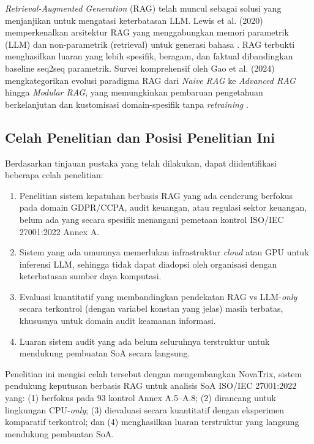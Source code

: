 \documentclass[bachelor,bahasa]{thesisdtetiugm}
\begin{document}
\textit{Retrieval-Augmented Generation} (RAG) telah muncul sebagai solusi yang menjanjikan untuk mengatasi keterbatasan LLM. Lewis et al. (2020) memperkenalkan arsitektur RAG yang menggabungkan memori parametrik (LLM) dan non-parametrik (retrieval) untuk generasi bahasa \cite{ragoriginal}. RAG terbukti menghasilkan luaran yang lebih spesifik, beragam, dan faktual dibandingkan baseline seq2seq parametrik. Survei komprehensif oleh Gao et al. (2024) mengkategorikan evolusi paradigma RAG dari \textit{Naive RAG} ke \textit{Advanced RAG} hingga \textit{Modular RAG}, yang memungkinkan pembaruan pengetahuan berkelanjutan dan kustomisasi domain-spesifik tanpa \textit{retraining} \cite{ragsurvey2024}.

\subsection{Celah Penelitian dan Posisi Penelitian Ini}

Berdasarkan tinjauan pustaka yang telah dilakukan, dapat diidentifikasi beberapa celah penelitian:

\begin{enumerate}
	\item Penelitian sistem kepatuhan berbasis RAG yang ada cenderung berfokus pada domain GDPR/CCPA, audit keuangan, atau regulasi sektor keuangan, belum ada yang secara spesifik menangani pemetaan kontrol ISO/IEC 27001:2022 Annex A.
	
	\item Sistem yang ada umumnya memerlukan infrastruktur \textit{cloud} atau GPU untuk inferensi LLM, sehingga tidak dapat diadopsi oleh organisasi dengan keterbatasan sumber daya komputasi.
	
	\item Evaluasi kuantitatif yang membandingkan pendekatan RAG vs LLM-\textit{only} secara terkontrol (dengan variabel konstan yang jelas) masih terbatas, khususnya untuk domain audit keamanan informasi.
	
	\item Luaran sistem audit yang ada belum seluruhnya terstruktur untuk mendukung pembuatan SoA secara langsung.
\end{enumerate}

Penelitian ini mengisi celah tersebut dengan mengembangkan NovaTrix, sistem pendukung keputusan berbasis RAG untuk analisis SoA ISO/IEC 27001:2022 yang: (1) berfokus pada 93 kontrol Annex A.5--A.8; (2) dirancang untuk lingkungan CPU-\textit{only}; (3) dievaluasi secara kuantitatif dengan eksperimen komparatif terkontrol; dan (4) menghasilkan luaran terstruktur yang langsung mendukung pembuatan SoA.
\end{document}
